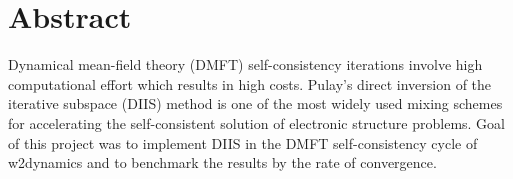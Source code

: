 \chapter*{Abstract}
\label{ch:abstract}

Dynamical mean-field theory (DMFT) self-consistency iterations involve high computational effort which results in high costs. Pulay's direct inversion of the iterative subspace (DIIS) method is one of the most widely used mixing schemes for accelerating the self-consistent solution of electronic structure problems. Goal of this project was to implement DIIS in the DMFT self-consistency cycle of w2dynamics\cite{w2dyn} and to benchmark the results by the rate of convergence.


